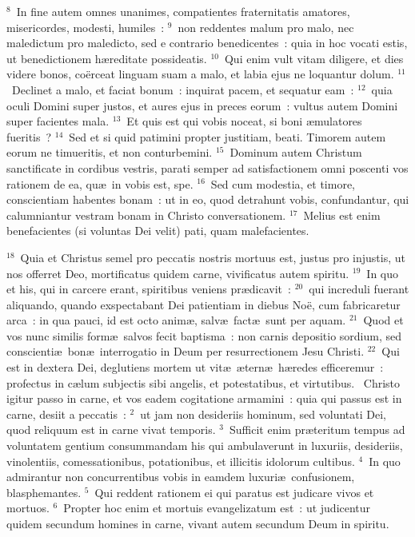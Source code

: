 ${}^{8}$~In fine autem omnes unanimes, compatientes fraternitatis amatores, misericordes, modesti, humiles~:
${}^{9}$~non reddentes malum pro malo, nec maledictum pro maledicto, sed e contrario benedicentes~: quia in hoc vocati estis, ut benedictionem h\ae reditate possideatis.
${}^{10}$~Qui enim vult vitam diligere, et dies videre bonos, co\"erceat linguam suam a malo, et labia ejus ne loquantur dolum.
${}^{11}$~Declinet a malo, et faciat bonum~: inquirat pacem, et sequatur eam~:
${}^{12}$~quia oculi Domini super justos, et aures ejus in preces eorum~: vultus autem Domini super facientes mala.
${}^{13}$~Et quis est qui vobis noceat, si boni \ae mulatores fueritis~?
${}^{14}$~Sed et si quid patimini propter justitiam, beati. Timorem autem eorum ne timueritis, et non conturbemini.
${}^{15}$~Dominum autem Christum sanctificate in cordibus vestris, parati semper ad satisfactionem omni poscenti vos rationem de ea, qu\ae\ in vobis est, spe.
${}^{16}$~Sed cum modestia, et timore, conscientiam habentes bonam~: ut in eo, quod detrahunt vobis, confundantur, qui calumniantur vestram bonam in Christo conversationem.
${}^{17}$~Melius est enim benefacientes (si voluntas Dei velit) pati, quam malefacientes.


${}^{18}$~Quia et Christus semel pro peccatis nostris mortuus est, justus pro injustis, ut nos offerret Deo, mortificatus quidem carne, vivificatus autem spiritu.
${}^{19}$~In quo et his, qui in carcere erant, spiritibus veniens pr\ae dicavit~:
${}^{20}$~qui increduli fuerant aliquando, quando exspectabant Dei patientiam in diebus No\"e, cum fabricaretur arca~: in qua pauci, id est octo anim\ae , salv\ae\ fact\ae\ sunt per aquam.
${}^{21}$~Quod et vos nunc similis form\ae\ salvos fecit baptisma~: non carnis depositio sordium, sed conscienti\ae\ bon\ae\ interrogatio in Deum per resurrectionem Jesu Christi.
${}^{22}$~Qui est in dextera Dei, deglutiens mortem ut vit\ae\ \ae tern\ae\ h\ae redes efficeremur~: profectus in c\ae lum subjectis sibi angelis, et potestatibus, et virtutibus.
~\lettrine[lines=10,image=true,loversize=0.05,lraise=-0.03]{C}{}hristo igitur passo in carne, et vos eadem cogitatione armamini~: quia qui passus est in carne, desiit a peccatis~:
${}^{2}$~ut jam non desideriis hominum, sed voluntati Dei, quod reliquum est in carne vivat temporis.
${}^{3}$~Sufficit enim pr\ae teritum tempus ad voluntatem gentium consummandam his qui ambulaverunt in luxuriis, desideriis, vinolentiis, comessationibus, potationibus, et illicitis idolorum cultibus.
${}^{4}$~In quo admirantur non concurrentibus vobis in eamdem luxuri\ae\ confusionem, blasphemantes.
${}^{5}$~Qui reddent rationem ei qui paratus est judicare vivos et mortuos.
${}^{6}$~Propter hoc enim et mortuis evangelizatum est~: ut judicentur quidem secundum homines in carne, vivant autem secundum Deum in spiritu.


